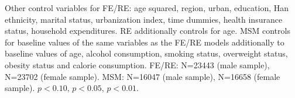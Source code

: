 \begin{table}[p]
\begin{adjustbox}{max width=\linewidth, center}
\begin{threeparttable}
{\begin{tablenotes}
Other control variables for FE/RE: age squared, region, urban, education, Han ethnicity, marital status, urbanization index, time dummies, health insurance status, household expenditures. RE additionally controls for age. MSM controls for baseline values of the same variables as the FE/RE models additionally to baseline values of age, alcohol consumption, smoking status, overweight status, obesity status and calorie consumption.  FE/RE: N=23443 (male sample), N=23702 (female sample).   MSM: N=16047 (male sample), N=16658 (female sample). \sym{*} \(p<0.10\), \sym{**} \(p<0.05\), \sym{***} \(p<0.01\).
\end{tablenotes}
}
\end{threeparttable}
\end{adjustbox}
\end{table}

\clearpage

